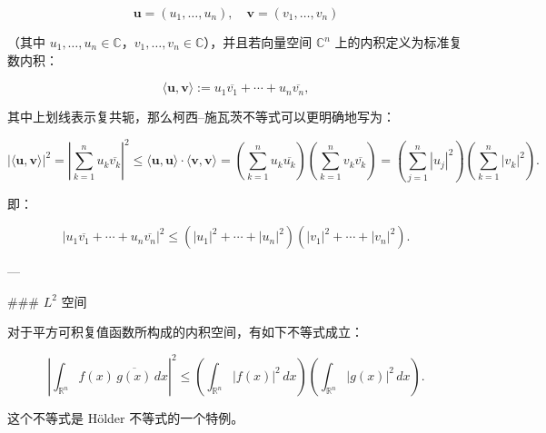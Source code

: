 $$
\mathbf{u} = (u_1, \ldots, u_n), \quad \mathbf{v} = (v_1, \ldots, v_n)
$$

（其中 $u_1, \ldots, u_n \in \mathbb{C}$，$v_1, \ldots, v_n \in \mathbb{C}$），并且若向量空间 $\mathbb{C}^n$ 上的内积定义为标准复数内积：

$$
\langle \mathbf{u}, \mathbf{v} \rangle := u_1 \overline{v_1} + \cdots + u_n \overline{v_n},
$$

其中上划线表示复共轭，那么柯西–施瓦茨不等式可以更明确地写为：

$$
\left| \langle \mathbf{u}, \mathbf{v} \rangle \right|^2 = \left| \sum_{k=1}^n u_k \overline{v_k} \right|^2 \leq \langle \mathbf{u}, \mathbf{u} \rangle \cdot \langle \mathbf{v}, \mathbf{v} \rangle = \left( \sum_{k=1}^n u_k \overline{u_k} \right) \left( \sum_{k=1}^n v_k \overline{v_k} \right) = \left( \sum_{j=1}^n |u_j|^2 \right) \left( \sum_{k=1}^n |v_k|^2 \right).
$$

即：

$$
\left| u_1 \overline{v_1} + \cdots + u_n \overline{v_n} \right|^2 \leq \left( |u_1|^2 + \cdots + |u_n|^2 \right) \left( |v_1|^2 + \cdots + |v_n|^2 \right).
$$

---

### $L^2$ 空间

对于平方可积复值函数所构成的内积空间，有如下不等式成立：

$$
\left| \int_{\mathbb{R}^n} f(x)\, \overline{g(x)}\, dx \right|^2 \leq \left( \int_{\mathbb{R}^n} |f(x)|^2\, dx \right) \left( \int_{\mathbb{R}^n} |g(x)|^2\, dx \right).
$$

这个不等式是 Hölder 不等式的一个特例。

